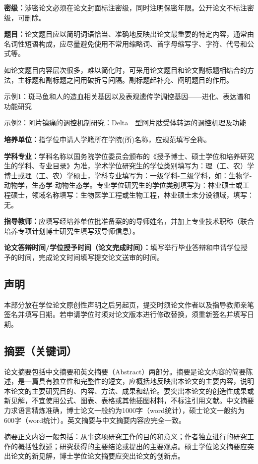 \textbf{密级：}涉密论文必须在论文封面标注密级，同时注明保密年限。公开论文不标注密级，可删除。

\textbf{题目：}论文题目应以简明词语恰当、准确地反映出论文最重要的特定内容，通常由名词性短语构成，应尽量避免使用不常用缩略词、首字母缩写字、字符、代号和公式等。

如论文题目内容层次很多，难以简化时，可采用论文题目和论文副标题相结合的方法，主标题和副标题之间用破折号间隔。副标题起补充、阐明题目的作用。

示例1：斑马鱼和人的造血相关基因以及表观遗传学调控基因——进化、表达谱和功能研究

示例2：阿片镇痛的调控机制研究：Delta　型阿片肽受体转运的调控机理及功能

\textbf{培养单位：}指学位申请人学籍所在学院(所)名称，应规范填写全称。

\textbf{学科专业：}学科名称以国务院学位委员会颁布的《授予博士、硕士学位和培养研究生的学科、专业目录》为准，学术学位研究生的学位类别填写为：理（工、农）学博士或理（工、农）学硕士，学科专业填写为：一级学科-二级学科，如：生物学-动物学，生态学-动物生态学。专业学位研究生的学位类别填写为：林业硕士或工程硕士，领域名称填写：生物医学工程或生物工程，林业硕士未分设领域，填写：无。

\textbf{指导教师：}应填写经培养单位批准备案的的导师姓名，并加上专业技术职称（联合培养专项计划博士研究生填写双导师信息）。

\textbf{论文答辩时间/学位授予时间（论文完成时间）：}填写举行毕业答辩和申请学位授予的时间，完成论文时间填写提交论文送审的时间。

\subsection{声明}
本部分放在学位论文原创性声明之后另起页，提交时须论文作者以及指导教师亲笔签名并填写日期。若申请学位时须对论文版本进行修改替换，须重新签名并填写日期。
\subsection{摘要（关键词）}
论文摘要包括中文摘要和英文摘要（Abstract）两部分。摘要是论文内容的简要陈述，是一篇具有独立性和完整性的短文，应概括地反映出本论文的主要内容，说明本论文的主要研究目的、内容、方法、成果和结论。要突出本论文的创造性成果或新见解，不宜使用公式、图表、表格或其他插图材料，不标注引用文献。中文摘要力求语言精炼准确，博士论文一般约为1000字（word统计），硕士论文一般约为600字（word统计）。英文摘要与中文摘要内容应完全一致。

摘要正文内容一般包括：从事这项研究工作的目的和意义；作者独立进行的研究工作的概括性叙述；研究获得的主要结论或提出的主要观点。硕士学位论文摘要应突出论文的新见解，博士学位论文摘要应突出论文的创新点。

